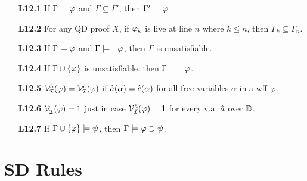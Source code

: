 \documentclass[a4paper, 11pt]{article} %
\begin{document}
\begin{enumerate}[labelsep=.1in]
  \item[\bf L12.1] If $\Gamma \models \varphi$ and $\Gamma \subseteq \Gamma'$, then $\Gamma' \models \varphi$.
  \item[\bf L12.2] For any QD proof $X$, if $\varphi_k$ is live at line $n$ where $k\leq n$, then $\Gamma_k\subseteq \Gamma_{n}$.
  \item[\bf L12.3] If $\Gamma \models \varphi$ and $\Gamma \models \neg\varphi$, then $\Gamma$ is unsatisfiable.
  \item[\bf L12.4] If $\Gamma \cup \lbrace\varphi\rbrace$ is unsatisfiable, then $\Gamma \models \neg\varphi$.
  \item[\bf L12.5] $\mathcal{V}_{\mathcal{I}}^{\hat{a}}(\varphi)=\mathcal{V}_{\mathcal{I}}^{\hat{c}}(\varphi)$ if $\hat{a}(\alpha)=\hat{c}(\alpha)$ for all free variables $\alpha$ in a wff $\varphi$.
  \item[\bf L12.6] $\mathcal{V}_{\mathcal{I}}^{}(\varphi)= 1$ just in case $\mathcal{V}_{\mathcal{I}}^{\hat{a}}(\varphi)= 1$ for every v.a. $\hat{a}$ over $\mathbb{D}$.
  \item[\bf L12.7] If $\Gamma \cup \lbrace\varphi\rbrace \models \psi$, then $\Gamma \models \varphi \supset \psi$.
\end{enumerate}




\section*{SD Rules}
\end{document}
